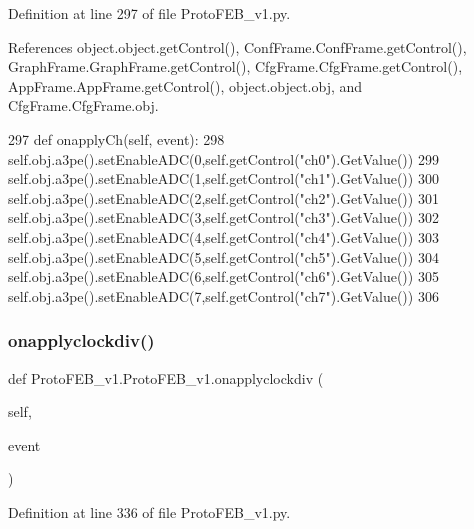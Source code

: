 Definition at line 297 of file Proto\+F\+E\+B\+\_\+v1.\+py.



References object.\+object.\+get\+Control(), Conf\+Frame.\+Conf\+Frame.\+get\+Control(), Graph\+Frame.\+Graph\+Frame.\+get\+Control(), Cfg\+Frame.\+Cfg\+Frame.\+get\+Control(), App\+Frame.\+App\+Frame.\+get\+Control(), object.\+object.\+obj, and Cfg\+Frame.\+Cfg\+Frame.\+obj.


\begin{DoxyCode}
297     \textcolor{keyword}{def }onapplyCh(self, event):
298         self.obj.a3pe().setEnableADC(0,self.getControl(\textcolor{stringliteral}{"ch0"}).GetValue())
299         self.obj.a3pe().setEnableADC(1,self.getControl(\textcolor{stringliteral}{"ch1"}).GetValue())
300         self.obj.a3pe().setEnableADC(2,self.getControl(\textcolor{stringliteral}{"ch2"}).GetValue())
301         self.obj.a3pe().setEnableADC(3,self.getControl(\textcolor{stringliteral}{"ch3"}).GetValue())
302         self.obj.a3pe().setEnableADC(4,self.getControl(\textcolor{stringliteral}{"ch4"}).GetValue())
303         self.obj.a3pe().setEnableADC(5,self.getControl(\textcolor{stringliteral}{"ch5"}).GetValue())
304         self.obj.a3pe().setEnableADC(6,self.getControl(\textcolor{stringliteral}{"ch6"}).GetValue())
305         self.obj.a3pe().setEnableADC(7,self.getControl(\textcolor{stringliteral}{"ch7"}).GetValue())
306 
\end{DoxyCode}
\mbox{\label{classProtoFEB__v1_1_1ProtoFEB__v1_aa0834fab61762024dcc8c89ba06bd29b}} 
\subsubsection{\texorpdfstring{onapplyclockdiv()}{onapplyclockdiv()}}
{\footnotesize\ttfamily def Proto\+F\+E\+B\+\_\+v1.\+Proto\+F\+E\+B\+\_\+v1.\+onapplyclockdiv (\begin{DoxyParamCaption}\item[{}]{self,  }\item[{}]{event }\end{DoxyParamCaption})}



Definition at line 336 of file Proto\+F\+E\+B\+\_\+v1.\+py.



